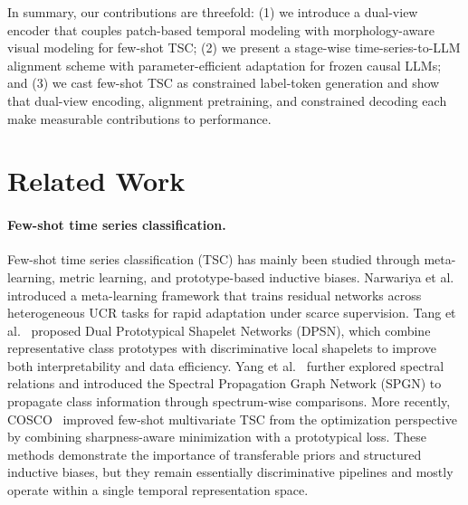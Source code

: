 \documentclass[lettersize,journal]{IEEEtran}
\begin{document}
In summary, our contributions are threefold: (1) we introduce a dual-view encoder that couples patch-based temporal modeling with morphology-aware visual modeling for few-shot TSC; (2) we present a stage-wise time-series-to-LLM alignment scheme with parameter-efficient adaptation for frozen causal LLMs; and (3) we cast few-shot TSC as constrained label-token generation and show that dual-view encoding, alignment pretraining, and constrained decoding each make measurable contributions to performance.

\section{Related Work}
\paragraph{Few-shot time series classification.}
Few-shot time series classification (TSC) has mainly been studied through meta-learning, metric learning, and prototype-based inductive biases. Narwariya et al.~\cite{narwariya2020meta} introduced a meta-learning framework that trains residual networks across heterogeneous UCR tasks for rapid adaptation under scarce supervision. Tang et al.~\cite{tang2020interpretable} proposed Dual Prototypical Shapelet Networks (DPSN), which combine representative class prototypes with discriminative local shapelets to improve both interpretability and data efficiency. Yang et al.~\cite{yang2022spectral} further explored spectral relations and introduced the Spectral Propagation Graph Network (SPGN) to propagate class information through spectrum-wise comparisons. More recently, COSCO~\cite{barreda2024cosco} improved few-shot multivariate TSC from the optimization perspective by combining sharpness-aware minimization with a prototypical loss. These methods demonstrate the importance of transferable priors and structured inductive biases, but they remain essentially discriminative pipelines and mostly operate within a single temporal representation space.
\end{document}

